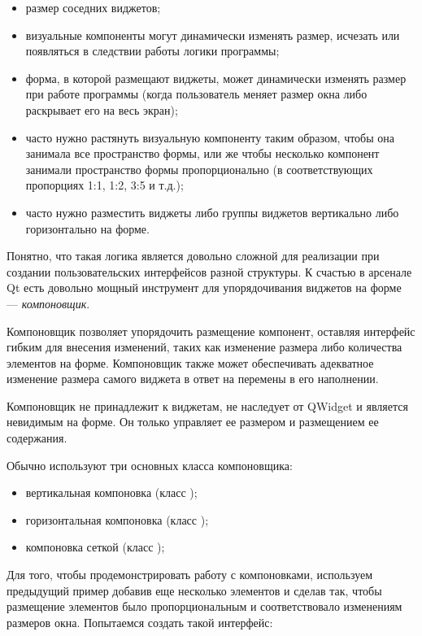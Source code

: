 \begin{itemize}
\item размер соседних виджетов;
\item визуальные компоненты могут динамически изменять размер, исчезать или появляться в следствии работы логики
программы;
\item форма, в которой размещают виджеты, может динамически изменять размер при  работе программы (когда пользователь
меняет размер окна либо раскрывает его на весь экран);
\item часто нужно растянуть визуальную компоненту таким образом, чтобы она занимала все пространство формы, или же чтобы
несколько компонент занимали пространство формы пропорционально (в соответствующих пропорциях 1:1, 1:2, 3:5 и т.д.);
\item часто нужно разместить виджеты либо группы виджетов вертикально либо горизонтально на форме.
\end{itemize}

Понятно, что такая логика является довольно сложной для реализации при создании пользовательских интерфейсов разной
структуры. К счастью в арсенале Qt есть довольно мощный инструмент для упорядочивания виджетов на форме ---
\emph{компоновщик}.

Компоновщик позволяет упорядочить размещение компонент, оставляя интерфейс гибким для внесения изменений, таких как
изменение размера либо количества элементов на форме. Компоновщик также может обеспечивать адекватное изменение размера
самого виджета в ответ на перемены в его наполнении.

Компоновщик не принадлежит к виджетам, не наследует от QWidget и является невидимым на форме. Он только управляет ее
размером и размещением ее содержания.

Обычно используют три основных класса компоновщика:

\begin{itemize}
\item вертикальная компоновка (класс );
\item горизонтальная компоновка (класс );
\item компоновка сеткой (класс );
\end{itemize}
Для того, чтобы продемонстрировать работу с компоновками, используем предыдущий пример добавив еще несколько элементов и
сделав так, чтобы размещение элементов было пропорциональным и соответствовало изменениям размеров окна. Попытаемся
создать такой интерфейс:

